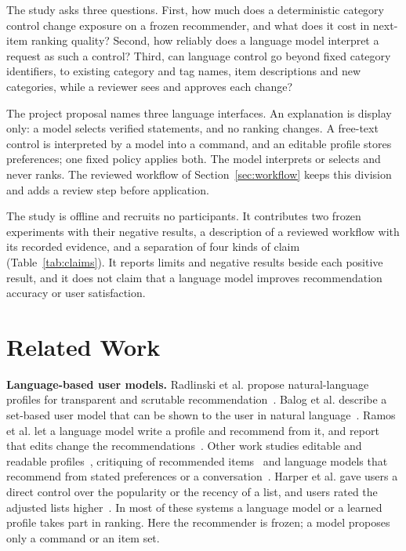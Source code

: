 \documentclass[conference]{IEEEtran}
\begin{document}
The study asks three questions. First, how much does a deterministic category control change exposure on a frozen recommender, and what does it cost in next-item ranking quality? Second, how reliably does a language model interpret a request as such a control? Third, can language control go beyond fixed category identifiers, to existing category and tag names, item descriptions and new categories, while a reviewer sees and approves each change?

The project proposal names three language interfaces. An explanation is display only: a model selects verified statements, and no ranking changes. A free-text control is interpreted by a model into a command, and an editable profile stores preferences; one fixed policy applies both. The model interprets or selects and never ranks. The reviewed workflow of Section~\ref{sec:workflow} keeps this division and adds a review step before application.

The study is offline and recruits no participants. It contributes two frozen experiments with their negative results, a description of a reviewed workflow with its recorded evidence, and a separation of four kinds of claim (Table~\ref{tab:claims}). It reports limits and negative results beside each positive result, and it does not claim that a language model improves recommendation accuracy or user satisfaction.

\section{Related Work}
\textbf{Language-based user models.} Radlinski et al. propose natural-language profiles for transparent and scrutable recommendation~\cite{radlinski2022profiles}. Balog et al. describe a set-based user model that can be shown to the user in natural language~\cite{balog2019transparent}. Ramos et al. let a language model write a profile and recommend from it, and report that edits change the recommendations~\cite{ramos2024transparent}. Other work studies editable and readable profiles~\cite{wozniak2025profiles,zhou2024language,mysore2023editable}, critiquing of recommended items~\cite{chen2012critiquing} and language models that recommend from stated preferences or a conversation~\cite{sanner2023competitive,he2023zeroshot}. Harper et al. gave users a direct control over the popularity or the recency of a list, and users rated the adjusted lists higher~\cite{harper2015control}. In most of these systems a language model or a learned profile takes part in ranking. Here the recommender is frozen; a model proposes only a command or an item set.
\end{document}
